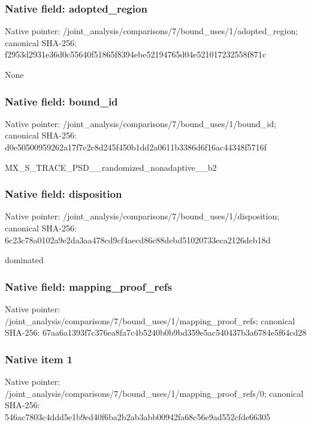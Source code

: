 \documentclass[10pt,a4paper]{article}
\begin{document}
\subsubsection{Native field: adopted\_\allowbreak{}region}
Native pointer: /joint\_\allowbreak{}analysis/comparisons/7/bound\_\allowbreak{}uses/1/adopted\_\allowbreak{}region; canonical SHA-256: f2953d2931e36d0c55640f51865f8394ebe52194765d04e521017232558f871c

\begingroup\raggedright\sloppy None\par\endgroup

\subsubsection{Native field: bound\_\allowbreak{}id}
Native pointer: /joint\_\allowbreak{}analysis/comparisons/7/bound\_\allowbreak{}uses/1/bound\_\allowbreak{}id; canonical SHA-256: d0e50500959262a17f7e2c8d245f450b1dd2a0611b3386d6f16ac44348f5716f

\begingroup\raggedright\sloppy MX\_\allowbreak{}S\_\allowbreak{}TRACE\_\allowbreak{}PSD\_\allowbreak{}\_\allowbreak{}randomized\_\allowbreak{}nonadaptive\_\allowbreak{}\_\allowbreak{}b2\par\endgroup

\subsubsection{Native field: disposition}
Native pointer: /joint\_\allowbreak{}analysis/comparisons/7/bound\_\allowbreak{}uses/1/disposition; canonical SHA-256: 6c23c78a0102a9e2da3aa478cd9cf4aecd86c88debd51020733eca2126deb18d

\begingroup\raggedright\sloppy dominated\par\endgroup

\subsubsection{Native field: mapping\_\allowbreak{}proof\_\allowbreak{}refs}
Native pointer: /joint\_\allowbreak{}analysis/comparisons/7/bound\_\allowbreak{}uses/1/mapping\_\allowbreak{}proof\_\allowbreak{}refs; canonical SHA-256: 67aa6a1393f7c376ea8fa7c4b5240b0b9bd359e5ac540437b3a6784e5f64cd28

\subsubsection{Native item 1}
Native pointer: /joint\_\allowbreak{}analysis/comparisons/7/bound\_\allowbreak{}uses/1/mapping\_\allowbreak{}proof\_\allowbreak{}refs/0; canonical SHA-256: 546ac7803c4ddd5e1b9ed40f6ba2b2ab3abb00942fa68c56e9ad552cfde66305
\end{document}
